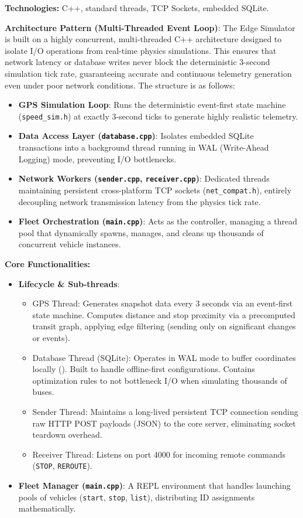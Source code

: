 \documentclass[a4paper]{article}
\begin{document}
\textbf{Technologies:} C++, standard threads, TCP Sockets, embedded SQLite.
\medskip

\textbf{Architecture Pattern (Multi-Threaded Event Loop)}: The Edge Simulator is built on a highly concurrent, multi-threaded C++ architecture designed to isolate I/O operations from real-time physics simulations. This ensures that network latency or database writes never block the deterministic 3-second simulation tick rate, guaranteeing accurate and continuous telemetry generation even under poor network conditions. The structure is as follows:
\begin{itemize}
    \item \textbf{GPS Simulation Loop}: Runs the deterministic event-first state machine (\texttt{speed\_sim.h}) at exactly 3-second ticks to generate highly realistic telemetry.
    \item \textbf{Data Access Layer (\texttt{database.cpp})}: Isolates embedded SQLite transactions into a background thread running in WAL (Write-Ahead Logging) mode, preventing I/O bottlenecks.
    \item \textbf{Network Workers (\texttt{sender.cpp}, \texttt{receiver.cpp})}: Dedicated threads maintaining persistent cross-platform TCP sockets (\texttt{net\_compat.h}), entirely decoupling network transmission latency from the physics tick rate.
    \item \textbf{Fleet Orchestration (\texttt{main.cpp})}: Acts as the controller, managing a thread pool that dynamically spawns, manages, and cleans up thousands of concurrent vehicle instances.
\end{itemize}
\medskip

\textbf{Core Functionalities:}
\begin{itemize}
    \item \textbf{Lifecycle \& Sub-threads}:
    \begin{itemize}
        \item GPS Thread: Generates snapshot data every 3 seconds via an event-first state machine. Computes distance and stop proximity via a precomputed transit graph, applying edge filtering (sending only on significant changes or events).
        \item Database Thread (SQLite): Operates in WAL mode to buffer coordinates locally (). Built to handle offline-first configurations. Contains optimization rules to not bottleneck I/O when simulating thousands of buses.
        \item Sender Thread: Maintains a long-lived persistent TCP connection sending raw HTTP POST payloads (JSON) to the core server, eliminating socket teardown overhead.
        \item Receiver Thread: Listens on port 4000 for incoming remote commands (\texttt{STOP}, \texttt{REROUTE}).
    \end{itemize}
    \item \textbf{Fleet Manager (\texttt{main.cpp})}: A REPL environment that handles launching pools of vehicles (\texttt{start}, \texttt{stop}, \texttt{list}), distributing ID assignments mathematically.
\end{itemize}
\end{document}
